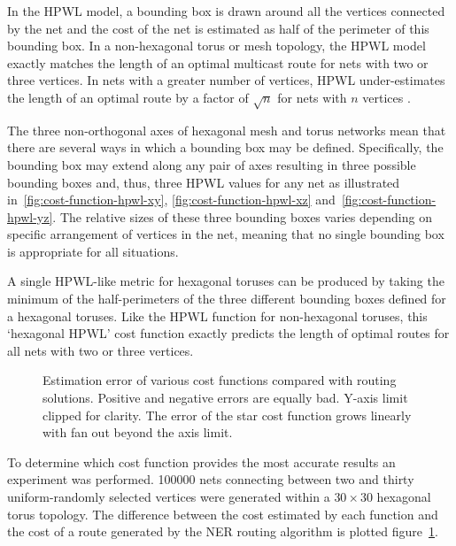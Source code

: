 				In the HPWL model, a bounding box is drawn around all the vertices
				connected by the net and the cost of the net is estimated as half of
				the perimeter of this bounding box. In a non-hexagonal torus or mesh
				topology, the HPWL model exactly matches the length of an optimal
				multicast route for nets with two or three vertices. In nets with a
				greater number of vertices, HPWL under-estimates the length of an
				optimal route by a factor of $\sqrt{n}$ for nets with $n$ vertices
				\cite{chung79}.
				
				The three non-orthogonal axes of hexagonal mesh and torus networks mean
				that there are several ways in which a bounding box may be defined.
				Specifically, the bounding box may extend along any pair of axes
				resulting in three possible bounding boxes and, thus, three HPWL values
				for any net as illustrated in~\ref{fig:cost-function-hpwl-xy},
				\ref{fig:cost-function-hpwl-xz} and~\ref{fig:cost-function-hpwl-yz}.
				The relative sizes of these three bounding boxes varies depending on
				specific arrangement of vertices in the net, meaning that no single
				bounding box is appropriate for all situations.
				
				A single HPWL-like metric for hexagonal toruses can be produced by
				taking the minimum of the half-perimeters of the three different
				bounding boxes defined for a hexagonal toruses. Like the HPWL function
				for non-hexagonal toruses, this `hexagonal HPWL' cost function exactly
				predicts the length of optimal routes for all nets with two or three
				vertices.
				
				\begin{figure}
					\center
					
					\caption[Estimation error of various cost functions.]%
					{Estimation error of various cost functions compared with
					routing solutions. Positive and negative errors are equally bad.
					Y-axis limit clipped for clarity. The error of the star cost function
					grows linearly with fan out beyond the axis limit.}
					\label{fig:cost-function-error}
				\end{figure}
				
				To determine which cost function provides the most accurate results an
				experiment was performed. \num{100000} nets connecting between two and
				thirty uniform-randomly selected vertices were generated within a
				$30\times30$ hexagonal torus topology. The difference between the cost
				estimated by each function and the cost of a route generated by the NER
				routing algorithm is plotted figure~\ref{fig:cost-function-error}.
				

